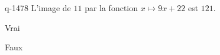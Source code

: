 \begin{truefalse}{q-1478}
L'image de $11$ par la fonction $x\mapsto 9x+22$ est $121$.
\item* Vrai
\item Faux
\end{truefalse}

